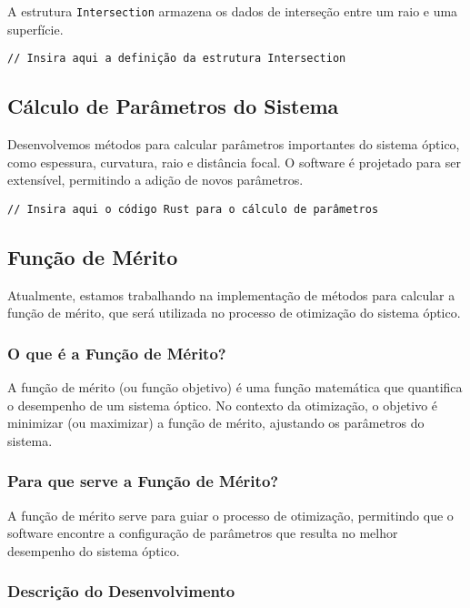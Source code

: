 \documentclass[a4paper,brazilian,12pt]{article}
\begin{document}
A estrutura \texttt{Intersection} armazena os dados de interseção entre um raio e uma superfície.

\begin{verbatim}
// Insira aqui a definição da estrutura Intersection
\end{verbatim}

\subsection{Cálculo de Parâmetros do Sistema}

Desenvolvemos métodos para calcular parâmetros importantes do sistema óptico, como espessura, curvatura, raio e distância focal. O software é projetado para ser extensível, permitindo a adição de novos parâmetros.

\begin{verbatim}
// Insira aqui o código Rust para o cálculo de parâmetros
\end{verbatim}

\subsection{Função de Mérito}

Atualmente, estamos trabalhando na implementação de métodos para calcular a função de mérito, que será utilizada no processo de otimização do sistema óptico.

\subsubsection{O que é a Função de Mérito?}

A função de mérito (ou função objetivo) é uma função matemática que quantifica o desempenho de um sistema óptico. No contexto da otimização, o objetivo é minimizar (ou maximizar) a função de mérito, ajustando os parâmetros do sistema.

\subsubsection{Para que serve a Função de Mérito?}

A função de mérito serve para guiar o processo de otimização, permitindo que o software encontre a configuração de parâmetros que resulta no melhor desempenho do sistema óptico.

\subsubsection{Descrição do Desenvolvimento}
\end{document}
